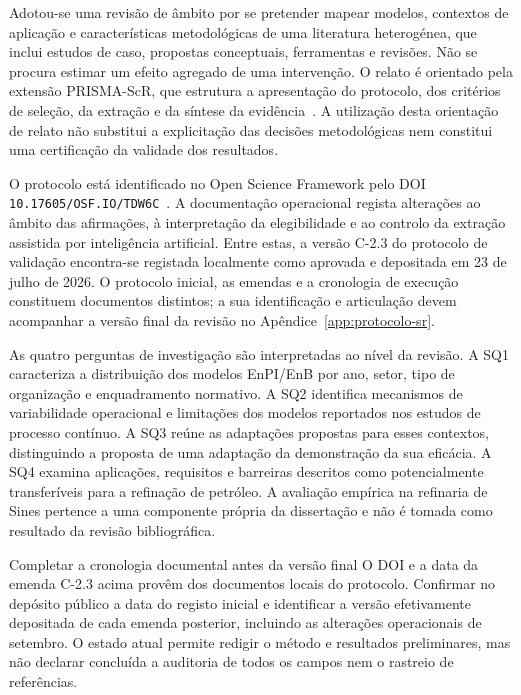 Adotou-se uma revisão de âmbito por se pretender mapear modelos,
contextos de aplicação e características metodológicas de uma literatura
heterogénea, que inclui estudos de caso, propostas conceptuais, ferramentas
e revisões. Não se procura estimar um efeito agregado de uma intervenção.
O relato é orientado pela extensão PRISMA-ScR, que estrutura a apresentação
do protocolo, dos critérios de seleção, da extração e da síntese da
evidência~\cite{Tricco2018}. A utilização desta orientação de relato não
substitui a explicitação das decisões metodológicas nem constitui uma
certificação da validade dos resultados.

O protocolo está identificado no Open Science Framework pelo DOI
\nolinkurl{10.17605/OSF.IO/TDW6C}~\cite{Ribeiro2026Protocolo}.
A documentação operacional regista alterações ao âmbito das afirmações,
à interpretação da elegibilidade e ao controlo da extração assistida por
inteligência artificial. Entre estas, a versão C-2.3 do protocolo de
validação encontra-se registada localmente como aprovada e depositada em
23 de julho de 2026. O protocolo inicial, as emendas e a cronologia de
execução constituem documentos distintos; a sua identificação e articulação
devem acompanhar a versão final da revisão no Apêndice~\ref{app:protocolo-sr}.

As quatro perguntas de investigação são interpretadas ao nível da revisão.
A SQ1 caracteriza a distribuição dos modelos EnPI/EnB por ano, setor, tipo
de organização e enquadramento normativo. A SQ2 identifica mecanismos de
variabilidade operacional e limitações dos modelos reportados nos estudos
de processo contínuo. A SQ3 reúne as adaptações propostas para esses
contextos, distinguindo a proposta de uma adaptação da demonstração da sua
eficácia. A SQ4 examina aplicações, requisitos e barreiras descritos como
potencialmente transferíveis para a refinação de petróleo. A avaliação
empírica na refinaria de Sines pertence a uma componente própria da
dissertação e não é tomada como resultado da revisão bibliográfica.

{Completar a cronologia documental antes da versão final}
{O DOI e a data da emenda C-2.3 acima provêm dos documentos locais do
protocolo. Confirmar no depósito público a data do registo inicial e
identificar a versão efetivamente depositada de cada emenda posterior,
incluindo as alterações operacionais de setembro. O estado atual permite
redigir o método e resultados preliminares, mas não declarar concluída
a auditoria de todos os campos nem o rastreio de referências.}%

